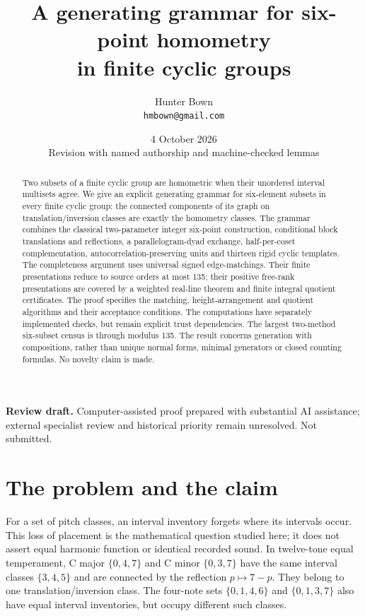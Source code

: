 \documentclass[11pt]{article}
\title{A generating grammar for six-point homometry\protect\\in finite cyclic groups}
\author{Hunter Bown\\\small \texttt{hmbown@gmail.com}}
\date{4 October 2026\\\small Revision with named authorship and machine-checked lemmas}
\theoremstyle{remark}
\begin{document}
\maketitle
\begin{center}
\small\textbf{Review draft.} Computer-assisted proof prepared with substantial AI assistance;\newline
external specialist review and historical priority remain unresolved. Not submitted.
\end{center}
\begin{abstract}
Two subsets of a finite cyclic group are homometric when their unordered
interval multisets agree. We give an explicit generating grammar for
six-element subsets in every finite cyclic group: the connected components
of its graph on translation/inversion classes are exactly the homometry
classes. The grammar combines the classical two-parameter integer
six-point construction, conditional block translations and reflections, a
parallelogram-dyad exchange, half-per-coset complementation,
autocorrelation-preserving units and thirteen rigid cyclic templates.
The completeness argument uses universal signed edge-matchings. Their
finite presentations reduce to source orders at most 135; their positive
free-rank presentations are covered by a weighted real-line theorem and
finite integral quotient certificates. The proof specifies the matching,
height-arrangement and quotient algorithms and their acceptance conditions.
The computations have separately implemented checks, but remain explicit
trust dependencies. The largest
two-method six-subset census is through modulus 135. The result concerns
generation with compositions, rather than unique normal forms, minimal
generators or closed counting formulas. No novelty claim is made.
\end{abstract}
\tableofcontents

\section{The problem and the claim}
For a set of pitch classes, an interval inventory forgets where its intervals
occur. This loss of placement is the mathematical question studied here;
it does not assert equal harmonic function or identical recorded sound.
In twelve-tone equal temperament, C major $\{0,4,7\}$ and C minor
$\{0,3,7\}$ have the same interval classes $\{3,4,5\}$ and are connected
by the reflection $p\mapsto7-p$. They belong to one translation/inversion
class. The four-note sets $\{0,1,4,6\}$ and $\{0,1,3,7\}$ also have
equal interval inventories, but occupy different such classes.
\end{document}
